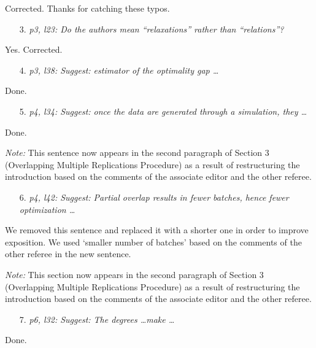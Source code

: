 \documentclass[11pt,notitlepage,onecolumn]{article}
\newcommand{\noi}{\noindent}
\begin{document}
\noindent 
Corrected. Thanks for catching these typos.
\medskip 


\begin{itemize}
\item[3.] \textit{p3, l23: Do the authors mean ``relaxations'' rather than ``relations''?}
\end{itemize}

\noindent 
Yes. Corrected. 
\medskip 


\begin{itemize}
\item[4.] \textit{p3, l38: Suggest: estimator of the optimality gap \ldots}
\end{itemize}

\noindent 
Done.
\medskip 


\begin{itemize}
\item[5.] \textit{p4, l34: Suggest: once the data are generated through a simulation, they \ldots}
\end{itemize}

\noindent 
Done. 
\smallskip 

\noi 
{\it Note:} This sentence now appears in the second paragraph of Section 3 (Overlapping Multiple Replications Procedure) as a result of restructuring the introduction based on the comments of the associate editor and the other referee. 
\medskip 


\begin{itemize}
\item[6.] \textit{p4, l42: Suggest: Partial overlap results in fewer batches, hence fewer optimization \ldots}
\end{itemize}

\noindent 
We removed this sentence and replaced it with a shorter one in order to improve exposition. 
We used `smaller number of batches' based on the comments of the other referee in the new sentence. 
\smallskip 

\noi 
{\it Note:} This section now appears in the second paragraph of Section 3 (Overlapping Multiple Replications Procedure) as a result of restructuring the introduction based on the comments of the associate editor and the other referee. 
\medskip 


\begin{itemize}
\item[7.] \textit{p6, l32: Suggest: The degrees \ldots make \ldots}
\end{itemize}

\noindent 
Done. 
\end{document}
